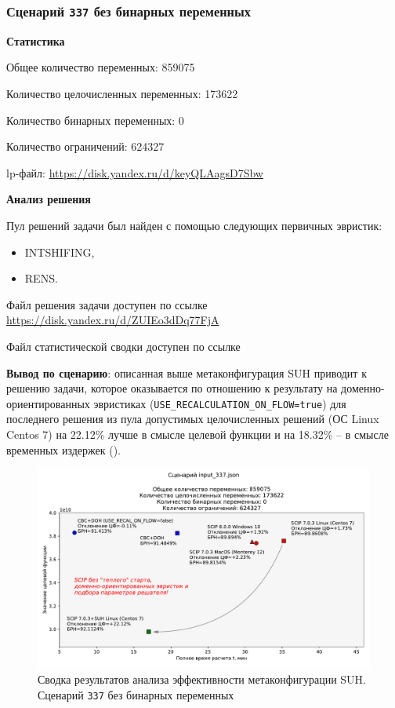 \documentclass[%
	11pt,
	a4paper,
	utf8,
		]{article}
\begin{document}
\subsubsection{Сценарий \texttt{337} без бинарных переменных}

\textbf{Статистика}\vspace*{1mm}

Общее количество переменных: 859075

Количество целочисленных переменных: 173622

Количество бинарных переменных: 0

Количество ограничений: 624327

lp-файл: \url{https://disk.yandex.ru/d/keyQLAagsD7Sbw}

\vspace*{5mm}\textbf{Анализ решения}\vspace*{1mm}

Пул решений задачи был найден с помощью следующих первичных эвристик:
\begin{itemize}
	\item INTSHIFING,
	
	\item RENS.
\end{itemize}

Файл решения задачи доступен по ссылке \url{https://disk.yandex.ru/d/ZUIEo3dDq77FjA}

Файл статистической сводки доступен по ссылке \url{}

\vspace*{3mm}
\textbf{Вывод по сценарию}: описанная выше метаконфигурация SUH приводит к решению задачи, которое оказывается по отношению к результату на доменно-ориентированных эвристиках (\verb|USE_RECALCULATION_ON_FLOW=true|) для последнего решения из пула допустимых целочисленных решений (ОС Linux Centos 7) на 22.12\% лучше в смысле целевой функции и на 18.32\% -- в смысле временных издержек ().

\begin{figure}[!h]
	\centering
	\includegraphics[scale=0.6]{figures/summary_337.pdf}
	\caption{Сводка результатов анализа эффективности метаконфигурации SUH. \\Сценарий \texttt{337} без бинарных переменных}\label{fig:summary_337}
\end{figure}
\end{document}
